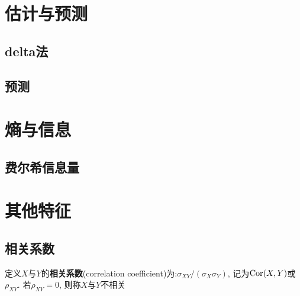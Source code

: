 \section{估计与预测}

\subsection{delta法}

\subsection{预测}

\section{熵与信息}

\subsection{费尔希信息量}



\section{其他特征}

\subsection{相关系数}

\begin{definition}
    定义$X$与$Y$的\textbf{相关系数}(correlation coefficient)为:$\sigma_{XY}/(\sigma_{X}\sigma_{Y})$, 记为$\operatorname{Cor}(X,Y)$或$\rho_{XY}$. 若$\rho_{XY}=0$, 则称$X$与$Y$不相关
\end{definition}

